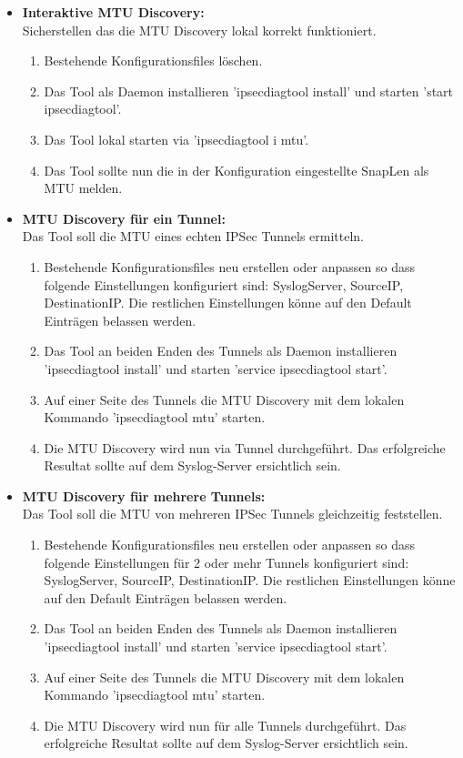 \begin{itemize}
\item[\Square] \textbf{Interaktive MTU Discovery:}\\
Sicherstellen das die MTU Discovery lokal korrekt funktioniert.
\begin{enumerate} \itemsep1pt \parskip0pt 
  \item Bestehende Konfigurationsfiles löschen.  
  \item Das Tool als Daemon installieren 'ipsecdiagtool install' und starten 'start ipsecdiagtool'.
  \item Das Tool lokal starten via 'ipsecdiagtool i mtu'.
  \item Das Tool sollte nun die in der Konfiguration eingestellte SnapLen als MTU melden.
\end{enumerate}
			   
\item[\Square] \textbf{MTU Discovery für ein Tunnel:}\\
Das Tool soll die MTU eines echten IPSec Tunnels ermitteln.
\begin{enumerate} \itemsep1pt \parskip0pt 
  \item Bestehende Konfigurationsfiles neu erstellen oder anpassen so dass folgende Einstellungen konfiguriert sind: SyslogServer, SourceIP, DestinationIP. Die restlichen Einstellungen könne auf den Default Einträgen belassen werden.
  \item Das Tool an beiden Enden des Tunnels als Daemon installieren 'ipsecdiagtool install' und starten 'service ipsecdiagtool start'.
  \item Auf einer Seite des Tunnels die MTU Discovery mit dem lokalen Kommando 'ipsecdiagtool mtu' starten.
  \item Die MTU Discovery wird nun via Tunnel durchgeführt. Das erfolgreiche Resultat sollte auf dem Syslog-Server ersichtlich sein.
\end{enumerate}

\item[\Square] \textbf{MTU Discovery für mehrere Tunnels:}\\
Das Tool soll die MTU von mehreren IPSec Tunnels gleichzeitig feststellen.
\begin{enumerate} \itemsep1pt \parskip0pt 
  \item Bestehende Konfigurationsfiles neu erstellen oder anpassen so dass folgende Einstellungen für 2 oder mehr Tunnels konfiguriert sind: SyslogServer, SourceIP, DestinationIP. Die restlichen Einstellungen könne auf den Default Einträgen belassen werden.
  \item Das Tool an beiden Enden des Tunnels als Daemon installieren 'ipsecdiagtool install' und starten 'service ipsecdiagtool start'.
  \item Auf einer Seite des Tunnels die MTU Discovery mit dem lokalen Kommando 'ipsecdiagtool mtu' starten.
  \item Die MTU Discovery wird nun für alle Tunnels durchgeführt. Das erfolgreiche Resultat sollte auf dem Syslog-Server ersichtlich sein.
\end{enumerate}


\end{itemize}
